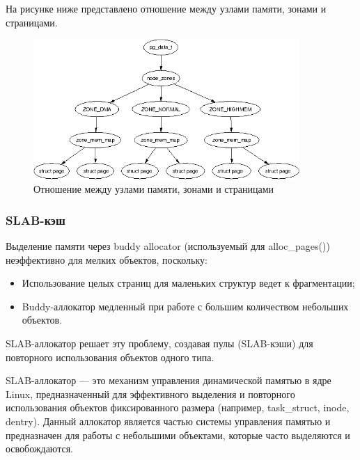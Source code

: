 На рисунке ниже представлено отношение между узлами памяти, зонами и страницами.

\begin{figure}[H]
	\centering
	\includegraphics[width=0.9\textwidth]{img/zones.png}
	\caption{Отношение между узлами памяти, зонами и страницами~\cite{pmem}}
	\label{fig:pmem}
\end{figure}

\subsubsection{SLAB-кэш}

Выделение памяти через buddy allocator (используемый для {alloc\_pages()}) неэффективно для мелких объектов, поскольку:
\begin{itemize}
    \item Использование целых страниц для маленьких структур ведет к фрагментации;
    \item Buddy-аллокатор медленный при работе с большим количеством небольших объектов.
\end{itemize}

SLAB-аллокатор решает эту проблему, создавая пулы (SLAB-кэши) для повторного использования объектов одного типа.

SLAB-аллокатор --- это механизм управления динамической памятью в ядре Linux, предназначенный для эффективного выделения и повторного использования объектов фиксированного размера (например, task\_struct, inode, dentry).
Данный аллокатор является частью системы управления памятью и предназначен для работы с небольшими объектами, которые часто выделяются и освобождаются.

